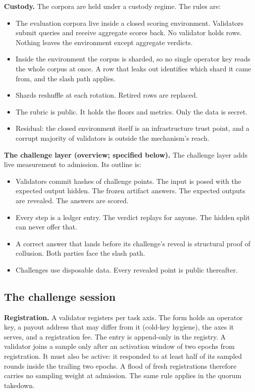 \documentclass[11pt]{article}
\begin{document}
\textbf{Custody.} The corpora are held under a custody
regime. The rules are:
\begin{itemize}
    \item The evaluation corpora live inside a closed scoring
          environment. Validators submit queries and receive aggregate
          scores back. No validator holds rows. Nothing leaves the
          environment except aggregate verdicts.
    \item Inside the environment the corpus is sharded, so no single
          operator key reads the whole corpus at once. A row that leaks out
          identifies which shard it came from, and the slash path applies.
    \item Shards reshuffle at each rotation. Retired rows are
          replaced.
    \item The rubric is public. It holds the floors and metrics. Only
          the data is secret.
    \item Residual: the closed environment itself is an
          infrastructure trust point, and a corrupt majority of validators
          is outside the mechanism's reach.
\end{itemize}

\textbf{The challenge layer (overview; specified below).} The
challenge layer adds live measurement to admission. Its outline
is:
\begin{itemize}
    \item Validators commit hashes of challenge points. The input is
          posed with the expected output hidden. The frozen artifact
          answers. The expected outputs are revealed. The answers are
          scored.
    \item Every step is a ledger entry. The verdict replays for
          anyone. The hidden split can never offer that.
    \item A correct answer that lands before its challenge's reveal
          is structural proof of collusion. Both parties face the slash
          path.
    \item Challenges use disposable data. Every revealed point is
          public thereafter.
\end{itemize}

\subsection{The challenge session}

\textbf{Registration.} A validator registers per task axis. The
form holds an operator key, a payout address that may differ from
it (cold-key hygiene), the axes it serves, and a registration fee.
The entry is append-only in the registry. A validator joins a
sample only after an activation window of two epochs from
registration. It must also be active: it responded to at least
half of its sampled rounds inside the trailing two epochs. A
flood of fresh registrations therefore carries no sampling weight
at admission. The same rule applies in the quorum takedown.
\end{document}
